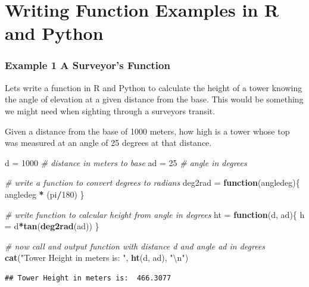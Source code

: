 \documentclass[]{book}
\newenvironment{Shaded}{\begin{snugshade}}{\end{snugshade}}
\newcommand{\KeywordTok}[1]{\textcolor[rgb]{0.13,0.29,0.53}{\textbf{#1}}}
\newcommand{\DecValTok}[1]{\textcolor[rgb]{0.00,0.00,0.81}{#1}}
\newcommand{\CharTok}[1]{\textcolor[rgb]{0.31,0.60,0.02}{#1}}
\newcommand{\StringTok}[1]{\textcolor[rgb]{0.31,0.60,0.02}{#1}}
\newcommand{\CommentTok}[1]{\textcolor[rgb]{0.56,0.35,0.01}{\textit{#1}}}
\newcommand{\ControlFlowTok}[1]{\textcolor[rgb]{0.13,0.29,0.53}{\textbf{#1}}}
\newcommand{\OperatorTok}[1]{\textcolor[rgb]{0.81,0.36,0.00}{\textbf{#1}}}
\newcommand{\NormalTok}[1]{#1}
\theoremstyle{definition}
\theoremstyle{definition}
\theoremstyle{definition}
\theoremstyle{remark}
\begin{document}
\section{Writing Function Examples in R and
Python}\label{writing-function-examples-in-r-and-python}

\subsubsection{Example 1 A Surveyor's
Function}\label{example-1-a-surveyors-function}

Lets write a function in R and Python to calculate the height of a tower
knowing the angle of elevation at a given distance from the base. This
would be something we might need when sighting through a surveyors
transit.

Given a distance from the base of 1000 meters, how high is a tower whose
top was measured at an angle of 25 degrees at that distance.

\begin{Shaded}
\begin{Highlighting}[]
\NormalTok{d =}\StringTok{ }\DecValTok{1000}    \CommentTok{# distance in meters to base}
\NormalTok{ad =}\StringTok{ }\DecValTok{25}     \CommentTok{# angle in degrees}

\CommentTok{# write a function to convert degrees to radians}
\NormalTok{deg2rad =}\StringTok{ }\ControlFlowTok{function}\NormalTok{(angledeg)\{}
\NormalTok{  angledeg }\OperatorTok{*}\StringTok{ }\NormalTok{(pi}\OperatorTok{/}\DecValTok{180}\NormalTok{)}
\NormalTok{\}}

\CommentTok{# write function to calcular height from angle in degrees}
\NormalTok{ht =}\StringTok{ }\ControlFlowTok{function}\NormalTok{(d, ad)\{}
\NormalTok{  h =}\StringTok{ }\NormalTok{d}\OperatorTok{*}\KeywordTok{tan}\NormalTok{(}\KeywordTok{deg2rad}\NormalTok{(ad))}
\NormalTok{\}}

\CommentTok{# now call and output function with distance d and angle ad in degrees}
\KeywordTok{cat}\NormalTok{(}\StringTok{"Tower Height in meters is: "}\NormalTok{, }\KeywordTok{ht}\NormalTok{(d, ad), }\StringTok{"}\CharTok{\textbackslash{}n}\StringTok{"}\NormalTok{)    }
\end{Highlighting}
\end{Shaded}

\begin{verbatim}
## Tower Height in meters is:  466.3077
\end{verbatim}
\end{document}
